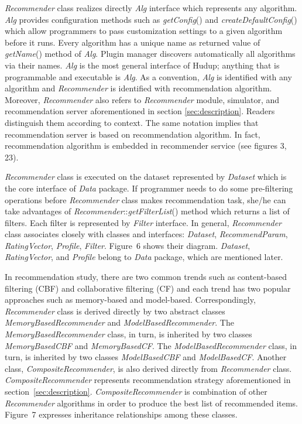 \documentclass[a4paper]{llncs}
\begin{document}
\textit{Recommender} class realizes directly \textit{Alg} interface which represents any algorithm. \textit{Alg} provides configuration methods such as \textit{getConfig}() and \textit{createDefaultConfig}() which allow programmers to pass customization settings to a given algorithm before it runs. Every algorithm has a unique name as returned value of \textit{getName}() method of \textit{Alg}. Plugin manager discovers automatically all algorithms via their names. \textit{Alg} is the most general interface of Hudup; anything that is programmable and executable is \textit{Alg}. As a convention, \textit{Alg} is identified with any algorithm and \textit{Recommender} is identified with recommendation algorithm. Moreover, \textit{Recommender} also refers to \textit{Recommender} module, simulator, and recommendation server aforementioned in section \ref{sec:description}. Readers distinguish them according to context. The same notation implies that recommendation server is based on recommendation algorithm. In fact, recommendation algorithm is embedded in recommender service (see figures 3, 23).

\textit{Recommender} class is executed on the dataset represented by \textit{Dataset} which is the core interface of \textit{Data} package. If programmer needs to do some pre-filtering operations before \textit{Recommender} class makes recommendation task, she/he can take advantages of \textit{Recommender}::\textit{getFilterList}() method which returns a list of filters. Each filter is represented by \textit{Filter} interface. In general, \textit{Recommender} class associates closely with classes and interfaces: \textit{Dataset}, \textit{RecommendParam}, \textit{RatingVector}, \textit{Profile}, \textit{Filter}. Figure~6 shows their diagram. \textit{Dataset}, \textit{RatingVector}, and \textit{Profile} belong to \textit{Data} package, which are mentioned later.

In recommendation study, there are two common trends such as content-based filtering (CBF) and collaborative filtering (CF) and each trend has two popular approaches such as memory-based and model-based. Correspondingly, \textit{Recommender} class is derived directly by two abstract classes \textit{MemoryBasedRecommender} and \textit{ModelBasedRecommender}. The \textit{MemoryBasedRecommender} class, in turn, is inherited by two classes \textit{MemoryBasedCBF} and \textit{MemoryBasedCF}. The \textit{ModelBasedRecommender} class, in turn, is inherited by two classes \textit{ModelBasedCBF} and \textit{ModelBasedCF}. Another class, \textit{CompositeRecommender}, is also derived directly from \textit{Recommender} class. \textit{CompositeRecommender} represents recommendation strategy aforementioned in section~\ref{sec:description}. \textit{CompositeRecommender} is combination of other \textit{Recommender} algorithms in order to produce the best list of recommended items. Figure~7 expresses inheritance relationships among these classes.
\end{document}
